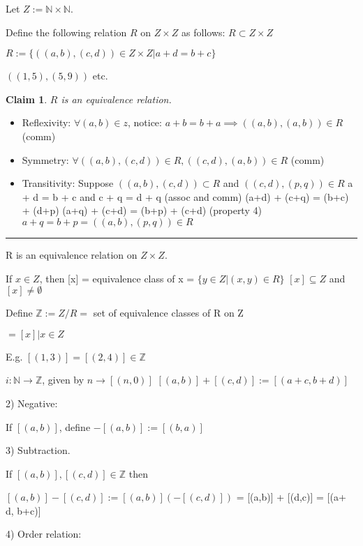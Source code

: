 \documentclass[twoside]{article}
\newcommand{\N}{\mathbb{N}}
\newcommand{\Z}{\mathbb{Z}}
\newtheorem{claim}[theorem]{Claim}
\newenvironment{proof}{{\bf Proof:}}{\hfill\rule{2mm}{2mm}}
\begin{document}
    Let $Z := \N \times \N$. 

    Define the following relation $R$ on $Z \times Z$ as follows: 
    $R \subset Z \times Z$

    $R := \{((a,b),(c,d)) \in Z \times Z \vert a+d = b+c \} $

    $((1,5),(5,9)) $ etc. 

    \begin{claim}
        $R$ is an equivalence relation. 
    \end{claim}
    \begin{proof}
        \begin{itemize}
            \item Reflexivity: $\forall (a,b) \in z$, notice: $a + b = b+a \implies ((a,b),(a,b)) \in R$ (comm)
            \item Symmetry:  $\forall ((a,b),(c,d)) \in R, ((c,d),(a,b)) \in R$ (comm)
            \item Transitivity: Suppose $((a,b),(c,d)) \subset R $ and $((c,d),(p,q)) \in R$
            a + d = b + c and c + q = d + q
            (assoc and comm)
            (a+d) + (c+q) = (b+c) + (d+p)
            (a+q) + (c+d) = (b+p) + (c+d)
            (property 4)
            $a+q = b+p = ((a,b), (p,q)) \in R$
        \end{itemize}
    \end{proof}

    R is an equivalence relation on $Z \times Z$.

    If $x \in Z$, then [x] = equivalence class of x = $\{y \in Z \vert (x,y) \in R\}$
    $[x] \subseteq Z $ and $ [x] \neq \emptyset$

    Define $\Z := Z/R =$ set of equivalence classes of R on Z 

    $= {[x] \vert x \in Z}$

    E.g. $[(1,3)] = [(2,4)] \in \Z$

    $i : \N \rightarrow \Z$, given by $n \rightarrow [(n,0)]$
    $ [(a,b)] + [(c,d)] := [(a+c, b+d)]$
    
    2) Negative:

    If $[(a,b)]$, define $-[(a,b)] := [(b,a)]$

    3) Subtraction.

    If $[(a,b)], [(c,d)] \in \Z$ then 

    $[(a,b)] - [(c,d)] := [(a,b)] (-[(c,d)])$
    = [(a,b)] + [(d,c)]
    = [(a+ d, b+c)]

    4) Order relation:
\end{document}
